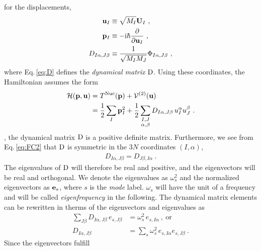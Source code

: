  for the displacements,
\begin{align}
	{\bf u}_I 
		&\equiv \sqrt{M_I} {\bf U}_I~, 
		\label{eq:uI} \\
	{\bf p}_I 
		&\equiv -\im \hbar \frac{\partial}{\partial {\bf u}_I}~,
		\label{eq:pI} \\
	D_{I \alpha, J \beta}
		&\equiv \frac{1}{\sqrt{M_I M_J}} 
		\Phi_{I \alpha, J \beta}~,
		\label{eq:D}
\end{align}
where Eq.\,\eqref{eq:D} defines the \emph{dynamical matrix} $\rm D$.
Using these coordinates, the Hamiltonian assumes the form
\begin{align}
	\begin{split}
		\mathcal{H}({\bf p}, {\bf u})
			&= T^{\rm Nuc} ({\bf p}) + \mathcal{V}^{(2)} ({\bf u})\\
			&= \halb \sum_I {\bf p}_I^2 + 
				\halb \sum_{\substack{I, J \\ \alpha, \beta}}
					D_{I \alpha, J \beta}
					\, u_I^\alpha u_J^\beta~.
	\end{split}
	\label{eq:ha.H1}
\end{align}
, the dynamical matrix $\rm D$ is a positive definite matrix. Furthermore, we see from Eq.\,\eqref{eq:FC2} that $\rm D$ is symmetric in the $3N$ coordinates $(I, \alpha)$,
\begin{align}
	D_{I \alpha, J \beta} = D_{J \beta, I \alpha}~.
	\label{eq:D.symmetric}
\end{align}
The eigenvalues of $\rm D$ will therefore be real and positive, and the eigenvectors will be real and orthogonal. We denote the eigenvalues as $\omega_s^2$ and the normalized eigenvectors as ${\bf e}_s$, where $s$ is the \emph{mode} label. $\omega_s$ will have the unit of a frequency and  will be called \emph{eigenfrequency} in the following. The dynamical matrix elements can be rewritten in therms of the eigenvectors and eigenvalues as
\begin{subequations}
\begin{align}
	\sum_{J \beta}
		D_{I \alpha, J \beta} \, e_{s, J \beta} 
			&= \omega^2_s \, e_{s, I \alpha}~,~\text{or} 
			\label{eq:sum_D_IJ} \\
		D_{I \alpha, J \beta}
			&= \sum_s \omega^2_s \, e_{s, I \alpha} e_{s, J \beta}~.
			\label{eq:D_IJs}
\end{align}
\end{subequations}
Since the eigenvectors fulfill
